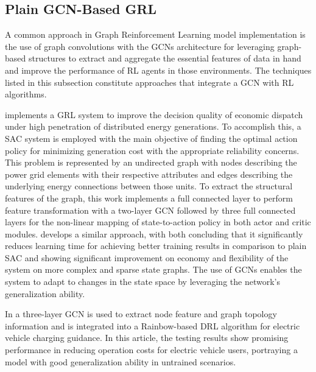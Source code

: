 \subsection{Plain GCN-Based GRL}

A common approach in Graph Reinforcement Learning model implementation is the use of graph convolutions with the \acp{GCN} architecture for leveraging graph-based structures to extract and aggregate the essential features of data in hand and improve the performance of \ac{RL} agents in those environments. The techniques listed in this subsection constitute approaches that integrate a \ac{GCN} with \ac{RL} algorithms.\par
\cite{liNovelGraphReinforcement2022} implements a \ac{GRL} system to improve the decision quality of economic dispatch under high penetration of distributed energy generations. To accomplish this, a \ac{SAC} system is employed with the main objective of finding the optimal action policy for minimizing generation cost with the appropriate reliability concerns. This problem is represented by an undirected graph with nodes describing the power grid elements with their respective attributes and edges describing the underlying energy connections between those units. To extract the structural features of the graph, this work implements a full connected layer to perform feature transformation with a two-layer \ac{GCN} followed by three full connected layers for the non-linear mapping of state-to-action policy in both actor and critic modules. \cite{chenScalableGraphReinforcement2023} develops a similar approach, with both concluding that it significantly reduces learning time for achieving better training results in comparison to plain \ac{SAC} and showing significant improvement on economy and flexibility of the system on more complex and sparse state graphs. The use of \acp{GCN} enables the system to adapt to changes in the state space by leveraging the network's generalization ability.\par
In \cite{xingGraphReinforcementLearningBased2023} a three-layer \ac{GCN} is used to extract node feature and graph topology information and is integrated into a Rainbow-based \cite{hesselRainbowCombiningImprovements2018} \ac{DRL} algorithm for electric vehicle charging guidance. In this article, the testing results show promising performance in reducing operation costs for electric vehicle users, portraying a model with good generalization ability in untrained scenarios. \par

